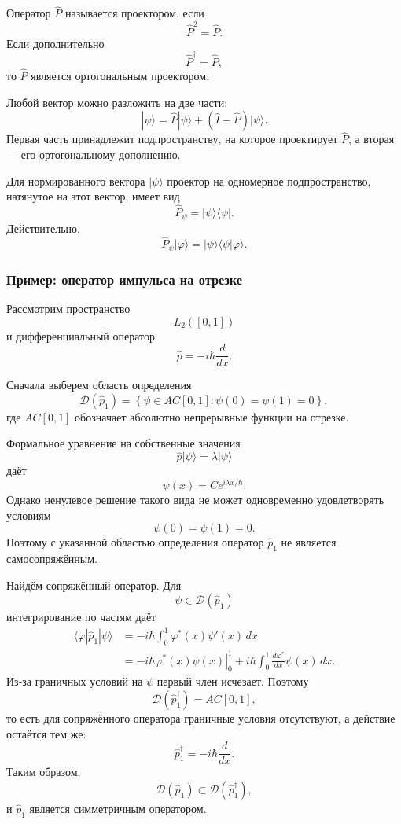 \documentclass[12pt,a4paper]{article}
\begin{document}
Оператор $\hat P$ называется проектором, если
\[
    \boxed{
        \hat P^2=\hat P
    }.
\]
Если дополнительно
\[
    \boxed{
        \hat P^\dagger=\hat P
    },
\]
то $\hat P$ является ортогональным проектором.

Любой вектор можно разложить на две части:
\[
    |\psi\rangle
    =
    \hat P|\psi\rangle
    +
    (\hat I-\hat P)|\psi\rangle.
\]
Первая часть принадлежит подпространству, на которое проектирует
$\hat P$, а вторая --- его ортогональному дополнению.

Для нормированного вектора $|\psi\rangle$ проектор на одномерное
подпространство, натянутое на этот вектор, имеет вид
\[
    \boxed{
        \hat P_\psi
        =
        |\psi\rangle\langle\psi|
    }.
\]
Действительно,
\[
    \hat P_\psi|\varphi\rangle
    =
    |\psi\rangle
    \langle\psi|\varphi\rangle.
\]


\subsubsection{Пример: оператор импульса на отрезке}

Рассмотрим пространство
\[
    L_2([0,1])
\]
и дифференциальный оператор
\[
    \boxed{
        \hat p=-i\hbar\frac{d}{dx}
    }.
\]

Сначала выберем область определения
\[
    \mathcal D(\hat p_1)
    =
    \left\{
        \psi\in AC[0,1]:
        \psi(0)=\psi(1)=0
    \right\},
\]
где $AC[0,1]$ обозначает абсолютно непрерывные функции на отрезке.

Формальное уравнение на собственные значения
\[
    \hat p|\psi\rangle
    =
    \lambda|\psi\rangle
\]
даёт
\[
    \psi(x)
    =
    C e^{i\lambda x/\hbar}.
\]
Однако ненулевое решение такого вида не может одновременно
удовлетворять условиям
\[
    \psi(0)=\psi(1)=0.
\]
Поэтому с указанной областью определения оператор $\hat p_1$ не
является самосопряжённым.

Найдём сопряжённый оператор. Для
\[
    \psi\in\mathcal D(\hat p_1)
\]
интегрирование по частям даёт
\begin{align*}
    \langle\varphi|\hat p_1|\psi\rangle
    &=
    -i\hbar
    \int_0^1
        \varphi^*(x)\psi'(x)\,dx \\
    &=
    -i\hbar
    \left.
        \varphi^*(x)\psi(x)
    \right|_0^1
    +
    i\hbar
    \int_0^1
        \frac{d\varphi^*}{dx}\psi(x)\,dx.
\end{align*}
Из-за граничных условий на $\psi$ первый член исчезает. Поэтому
\[
    \mathcal D(\hat p_1^\dagger)
    =
    AC[0,1],
\]
то есть для сопряжённого оператора граничные условия отсутствуют, а
действие остаётся тем же:
\[
    \hat p_1^\dagger
    =
    -i\hbar\frac{d}{dx}.
\]
Таким образом,
\[
    \mathcal D(\hat p_1)
    \subset
    \mathcal D(\hat p_1^\dagger),
\]
и $\hat p_1$ является симметричным оператором.
\end{document}
